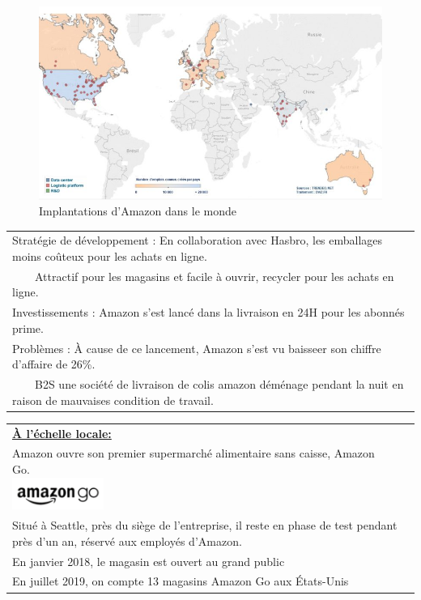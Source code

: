 \documentclass[12pt,landscape]{article}
\begin{document}
\begin{figure}[h]\captionsetup{format=sanslabel}
\begin{center}
\includegraphics[width=15cm]{cate_2.jpg}
\caption{Implantations d'Amazon dans le monde}
\end{center}
\end{figure}
    \vspace{0.5 cm}
\begin{tabular}{l}
 \rowcolor[RGB]{248,157,48} Stratégie de développement :  En collaboration avec Hasbro, les emballages moins coûteux pour les achats en ligne. \\
 \rowcolor[RGB]{248,157,48} ~~~~Attractif pour les magasins et facile à ouvrir, recycler pour les achats en ligne.\\
 \rowcolor[RGB]{248,157,48} Investissements : Amazon s'est lancé dans la livraison en 24H pour les abonnés prime.\\
 \rowcolor[RGB]{248,157,48} Problèmes : \`A cause de ce lancement, Amazon s'est vu baisseer son chiffre d'affaire de 26\%.\\
 \rowcolor[RGB]{248,157,48} ~~~~B2S une société de livraison de colis amazon déménage pendant la nuit en raison de mauvaises condition de travail.\\
\end{tabular}
\vspace{0.5 cm}

\begin{tabular}{l}
 \rowcolor[RGB]{248,157,48} \textbf{\underline{\`A l'échelle locale:}}\\
\rowcolor[RGB]{248,157,48} Amazon ouvre son premier supermarché alimentaire sans caisse, Amazon Go.~~~~~~~~~~~~~~~~~~~~~~~~~~~~~~~~~~~~~~~~~~~~~~~~~~~~~~~~~\includegraphics[width=3cm]{amazongo.png}\\ 
\rowcolor[RGB]{248,157,48}  Situé à Seattle, près du siège de l'entreprise, il reste en phase de test pendant près d'un an, réservé aux employés d'Amazon.\\
\rowcolor[RGB]{248,157,48} En janvier 2018, le magasin est ouvert au grand public\\
\rowcolor[RGB]{248,157,48}En juillet 2019, on compte 13 magasins Amazon Go aux États-Unis \\
\end{tabular}\\
\end{document}
